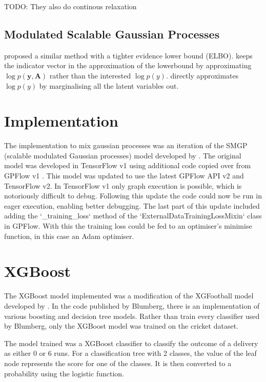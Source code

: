 \documentclass[12pt,a4paper]{report}
\theoremstyle{definition}
\begin{document}
TODO: They also do continous relaxation

\subsection{Modulated Scalable Gaussian Processes}

\citet{Lui2020} proposed a similar method with a tighter evidence lower bound (ELBO).
\citet{Kaiser2018} keeps the indicator vector in the approximation of the lowerbound by approximating $\log p(\textbf{y}, \textbf{A})$ rather than the interested $\log p(y)$.
\citet{Lui2020} directly approximates $\log p(y)$ by marginalising all the latent variables out.

\section{Implementation}

The implementation to mix gaussian processes was an iteration of the SMGP (scalable modulated Gaussian processes) model developed by \citet{Lui2020}.
The original model was developed in TensorFlow v1 using additional code copied over from GPFlow v1 \citep{GPflow2017}.
This model was updated to use the latest GPFlow API v2 and TensorFlow v2.
In TensorFlow v1 only graph execution is possible, which is notoriously difficult to debug.
Following this update the code could now be run in eager execution, enabling better debugging.
The last part of this update included adding the `_training_loss` method of the `ExternalDataTrainingLossMixin` class in GPFlow.
With this the training loss could be fed to an optimiser's minimise function, in this case an Adam optimiser.

\section{XGBoost}

The XGBoost \citep{Chen2016} model implemented was a modification of the XGFootball model developed by \citet{Blumberg2020}.
In the code published by Blumberg, there is an implementation of various boosting and decision tree models.
Rather than train every classifier used by Blumberg, only the XGBoost model was trained on the cricket dataset.

The model trained was a XGBoost classifier to classify the outcome of a delivery as either 0 or 6 runs.
For a classification tree with 2 classes, the value of the leaf node represents the score for one of the classes.
It is then converted to a probability using the logistic function.
\end{document}
